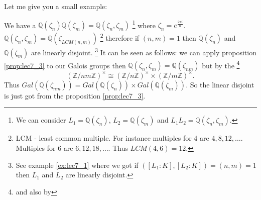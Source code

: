 Let me give you a small example:
\begin{example}
  We have a 
  $\mathbb{Q}\left(\zeta_n\right) \mathbb{Q}\left(\zeta_m\right) =
  \mathbb{Q}\left(\zeta_n, \zeta_m\right)$
  \footnote{
    We can consider $L_1 = \mathbb{Q}\left(\zeta_n\right)$,
    $L_2 = \mathbb{Q}\left(\zeta_m\right)$ and
    $L_1 L_2 = \mathbb{Q}\left(\zeta_n, \zeta_m\right)$.
  }
  where
  $\zeta_n = e^{\frac{2 \pi i}{n}}$.
  $\mathbb{Q}\left(\zeta_n, \zeta_m\right) =
  \mathbb{Q}\left(\zeta_{LCM\left(n,m\right)}\right)$
  \footnote{
    LCM - least common multiple. For instance multiples for 4 are
    $4,8,12, \dots$. Multiples for 6 are $6,12,18, \dots$. Thus
    $LCM\left(4,6\right) = 12$.
  } therefore if $\left(n,m\right) = 1$ then
  $\mathbb{Q}\left(\zeta_n\right)$ and
  $\mathbb{Q}\left(\zeta_m\right)$ are linearly disjoint.
  \footnote{
    See example \ref{ex:lec7_1} where we got if
    $\left(\left[L_1:K\right], \left[L_2:K\right]\right) =
    \left(n, m\right) = 1$ then $L_1$ and $L_2$ are linearly
    disjoint. 
  }
  It can be
  seen as follows: we can apply proposition \ref{prop:lec7_3} to our
  Galois groups then
  $\mathbb{Q}\left(\zeta_n, \zeta_m\right) =
  \mathbb{Q}\left(\zeta_{nm}\right)$ but by the
  \footnote{
    and also by 
  }
  \[
  \left(\mathbb{Z}/nm\mathbb{Z}\right)^\times \cong
  \left(\mathbb{Z}/n\mathbb{Z}\right)^\times \times
  \left(\mathbb{Z}/m\mathbb{Z}\right)^\times. 
  \]
  Thus $Gal\left(\mathbb{Q}\left(\zeta_{nm}\right)\right) =
  Gal\left(\mathbb{Q}\left(\zeta_{n}\right)\right) \times
  Gal\left(\mathbb{Q}\left(\zeta_{m}\right)\right)$. So the linear
  disjoint is just got from the proposition \ref{prop:lec7_3}.
\end{example}
